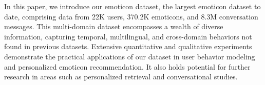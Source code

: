 In this paper, we introduce our emoticon dataset, the largest emoticon dataset to date, comprising data from 22K users, 370.2K emoticons, and 8.3M conversation messages. This multi-domain dataset encompasses a wealth of diverse information, capturing temporal, multilingual, and cross-domain behaviors not found in previous datasets. 
Extensive quantitative and qualitative experiments demonstrate the practical applications of our dataset in user behavior modeling and personalized emoticon recommendation. It also holds potential for further research in areas such as personalized retrieval and conversational studies.